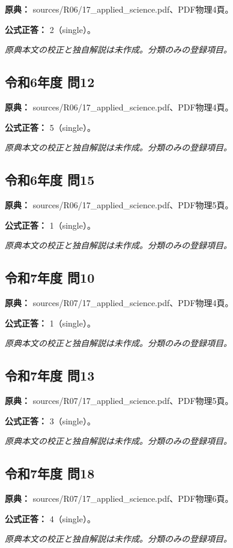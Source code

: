 \noindent\textbf{原典：} sources/R06/17\_applied\_science.pdf、PDF物理4頁。

\textbf{公式正答：} 2（single）。

\par\textit{原典本文の校正と独自解説は未作成。分類のみの登録項目。}

\subsection{令和6年度 問12}
\label{q:r06-reg-applied-12}

\noindent\textbf{原典：} sources/R06/17\_applied\_science.pdf、PDF物理4頁。

\textbf{公式正答：} 5（single）。

\par\textit{原典本文の校正と独自解説は未作成。分類のみの登録項目。}

\subsection{令和6年度 問15}
\label{q:r06-reg-applied-15}

\noindent\textbf{原典：} sources/R06/17\_applied\_science.pdf、PDF物理5頁。

\textbf{公式正答：} 1（single）。

\par\textit{原典本文の校正と独自解説は未作成。分類のみの登録項目。}

\subsection{令和7年度 問10}
\label{q:r07-reg-applied-10}

\noindent\textbf{原典：} sources/R07/17\_applied\_science.pdf、PDF物理4頁。

\textbf{公式正答：} 1（single）。

\par\textit{原典本文の校正と独自解説は未作成。分類のみの登録項目。}

\subsection{令和7年度 問13}
\label{q:r07-reg-applied-13}

\noindent\textbf{原典：} sources/R07/17\_applied\_science.pdf、PDF物理5頁。

\textbf{公式正答：} 3（single）。

\par\textit{原典本文の校正と独自解説は未作成。分類のみの登録項目。}

\subsection{令和7年度 問18}
\label{q:r07-reg-applied-18}

\noindent\textbf{原典：} sources/R07/17\_applied\_science.pdf、PDF物理6頁。

\textbf{公式正答：} 4（single）。

\par\textit{原典本文の校正と独自解説は未作成。分類のみの登録項目。}
